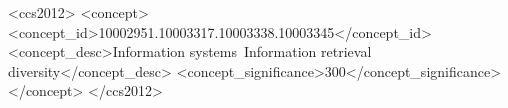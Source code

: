 %
%
\begin{CCSXML}
<ccs2012>
<concept>
<concept_id>10002951.10003317.10003338.10003345</concept_id>
<concept_desc>Information systems~Information retrieval diversity</concept_desc>
<concept_significance>300</concept_significance>
</concept>
</ccs2012>
\end{CCSXML}


%
%

%
%
\printccsdesc